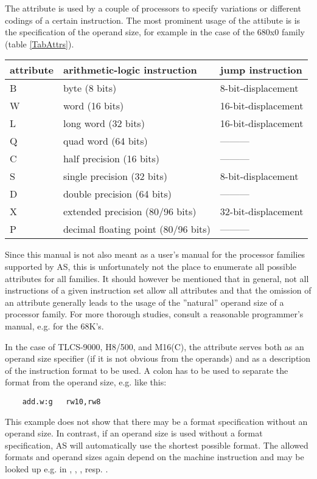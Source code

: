 \documentclass[12pt,twoside]{report}
\newcommand{\asname}{{AS}}
\begin{document}
The attribute is used by a couple of processors to specify variations or
different codings of a certain instruction.  The most prominent usage of
the attibute is is the specification of the operand size, for example in
the case of the 680x0 family (table \ref{TabAttrs}).
\begin{table*}[htb]
\begin{center}\begin{tabular}{|l|l|l|}
\hline
attribute & arithmetic-logic instruction & jump instruction\\
\hline
\hline
B     & byte (8 bits)                       &  8-bit-displacement \\
W     & word (16 bits)                      &  16-bit-displacement \\
L     & long word (32 bits)                 &  16-bit-displacement \\
Q     & quad word (64 bits)                 &  --------- \\
C     & half precision (16 bits)            &  --------- \\
S     & single precision (32 bits)          &  8-bit-displacement \\
D     & double precision (64 bits)          &  --------- \\
X     & extended precision (80/96 bits)     &  32-bit-displacement \\
P     & decimal floating point (80/96 bits) &  --------- \\
\hline
\end{tabular}\end{center}
\caption{Allowed Attributes (Example 680x0) \label{TabAttrs}}
\end{table*}
\par
Since this manual is not also meant as a user's manual for the processor
families supported by \asname{}, this is unfortunately not the place to enumerate
all possible attributes for all families.  It should however be mentioned
that in general, not all instructions of a given instruction set allow all
attributes and that the omission of an attribute generally leads to the
usage of the ''natural'' operand size of a processor family. For more
thorough studies, consult a reasonable programmer's manual, e.g.
\cite{Williams} for the 68K's.

In the case of TLCS-9000, H8/500, and M16(C), the attribute serves
both as an operand size specifier (if it is not obvious from the
operands) and as a description of the instruction format to be used.
A colon has to be used to separate the format from the operand size,
e.g. like this:
\begin{verbatim}
    add.w:g   rw10,rw8
\end{verbatim}
This example does not show that there may be a format specification
without an operand size.  In contrast, if an operand size is used
without a format specification, \asname{} will automatically use the
shortest possible format.  The allowed formats and operand sizes
again depend on the machine instruction and may be looked up e.g. in
\cite{Tosh900}, \cite{HitH8_5}, \cite{MitM16}, resp. \cite{MitM16C}.
\end{document}
